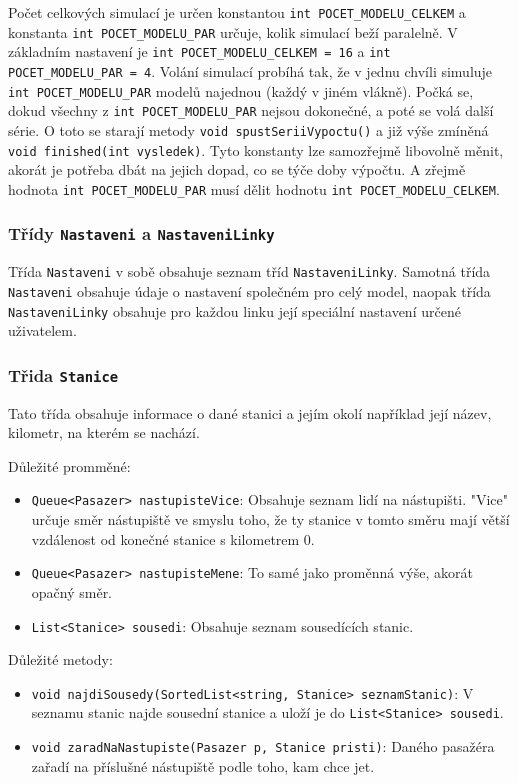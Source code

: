 \documentclass[12pt, a4paper]{article}
\begin{document}
Počet celkových simulací je určen konstantou \texttt{int POCET\_MODELU\_CELKEM} a konstanta \texttt{int POCET\_MODELU\_PAR} určuje, kolik simulací beží paralelně. V základním nastavení je  \texttt{int POCET\_MODELU\_CELKEM = 16} a \texttt{int POCET\_MODELU\_PAR = 4}. Volání simulací probíhá tak, že v jednu chvíli simuluje \texttt{int POCET\_MODELU\_PAR} modelů najednou (každý v jiném vlákně). Počká se, dokud všechny z \texttt{int POCET\_MODELU\_PAR} nejsou dokonečné, a poté se volá další série. O toto se starají metody \texttt{void spustSeriiVypoctu()} a již výše zmíněná \texttt{void finished(int vysledek)}. Tyto konstanty lze samozřejmě libovolně měnit, akorát je potřeba dbát na jejich dopad, co se týče doby výpočtu. A zřejmě hodnota \texttt{int POCET\_MODELU\_PAR} musí dělit hodnotu \texttt{int POCET\_MODELU\_CELKEM}.

\subsubsection{Třídy \texttt{Nastaveni} a \texttt{NastaveniLinky}}
Třída \texttt{Nastaveni} v sobě obsahuje seznam tříd \texttt{NastaveniLinky}. Samotná třída \texttt{Nastaveni} obsahuje údaje o nastavení společném pro celý model, naopak třída \texttt{NastaveniLinky} obsahuje pro každou linku její speciální nastavení určené uživatelem.

\subsubsection{Třida \texttt{Stanice}}
Tato třída obsahuje informace o dané stanici a jejím okolí například její název, kilometr, na kterém se nachází.

Důležité promměné:
\begin{itemize}
    \item{\texttt{Queue<Pasazer> nastupisteVice}}: Obsahuje seznam lidí na nástupišti. "Vice" určuje směr nástupiště ve smyslu toho, že ty stanice v tomto směru mají větší vzdálenost od konečné stanice s kilometrem 0.
    \item{\texttt{Queue<Pasazer> nastupisteMene}}: To samé jako proměnná výše, akorát opačný směr.
    \item{\texttt{List<Stanice> sousedi}}: Obsahuje seznam sousedících stanic.
\end{itemize}

Důležité metody:
\begin{itemize}
    \item{\texttt{void najdiSousedy(SortedList<string, Stanice> seznamStanic)}}: V seznamu stanic najde sousední stanice a uloží je do \texttt{List<Stanice> sousedi}.
    \item{\texttt{void zaradNaNastupiste(Pasazer p, Stanice pristi)}}: Daného pasažéra zařadí na příslušné nástupiště podle toho, kam chce jet.
\end{itemize}
\end{document}
